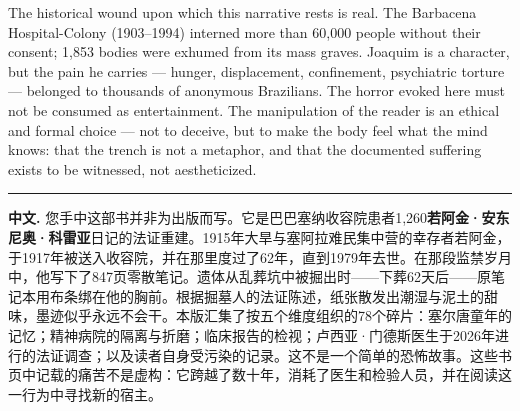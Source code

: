 \vspace{0.8em}

\vspace{0.8em}
\noindent The historical wound upon which this narrative rests is real. The Barbacena Hospital-Colony (1903--1994) interned more than 60,000 people without their consent; 1,853 bodies were exhumed from its mass graves. Joaquim is a character, but the pain he carries --- hunger, displacement, confinement, psychiatric torture --- belonged to thousands of anonymous Brazilians. The horror evoked here must not be consumed as entertainment. The manipulation of the reader is an ethical and formal choice --- not to deceive, but to make the body feel what the mind knows: that the trench is not a metaphor, and that the documented suffering exists to be witnessed, not aestheticized.

\vspace{0.8em}

\vspace{1.2em}
\noindent\rule{\textwidth}{0.5pt}
\vspace{0.8em}

\noindent\textbf{中文.} 您手中这部书并非为出版而写。它是巴巴塞纳收容院患者1,260\textbf{若阿金·安东尼奥·科雷亚}日记的法证重建。1915年大旱与塞阿拉难民集中营的幸存者若阿金，于1917年被送入收容院，并在那里度过了62年，直到1979年去世。在那段监禁岁月中，他写下了847页零散笔记。遗体从乱葬坑中被掘出时——下葬62天后——原笔记本用布条绑在他的胸前。根据掘墓人的法证陈述，纸张散发出潮湿与泥土的甜味，墨迹似乎永远不会干。本版汇集了按五个维度组织的78个碎片：塞尔唐童年的记忆；精神病院的隔离与折磨；临床报告的检视；卢西亚·门德斯医生于2026年进行的法证调查；以及读者自身受污染的记录。这不是一个简单的恐怖故事。这些书页中记载的痛苦不是虚构：它跨越了数十年，消耗了医生和检验人员，并在阅读这一行为中寻找新的宿主。

\vspace{0.8em}

